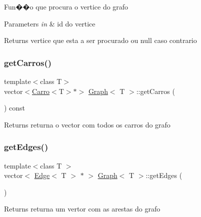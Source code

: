 Fun��o que procura o vertice do grafo 
\begin{DoxyParams}{Parameters}
{\em in} & id do vertice \\
\hline
\end{DoxyParams}
\begin{DoxyReturn}{Returns}
vertice que esta a ser procurado ou null caso contrario 
\end{DoxyReturn}
\mbox{\label{class_graph_ad9632be3533f44add76581600c89fd9f}} 
\subsubsection{\texorpdfstring{get\+Carros()}{getCarros()}}
{\footnotesize\ttfamily template$<$class T$>$ \\
vector$<$\mbox{\hyperlink{class_carro}{Carro}}$<$T$>$$\ast$$>$ \mbox{\hyperlink{class_graph}{Graph}}$<$ T $>$\+::get\+Carros (\begin{DoxyParamCaption}{ }\end{DoxyParamCaption}) const\hspace{0.3cm}{\ttfamily [inline]}}

\begin{DoxyReturn}{Returns}
returna o vector com todos os carros do grafo 
\end{DoxyReturn}
\mbox{\label{class_graph_acb8627c55454802f9e757d966f860938}} 
\subsubsection{\texorpdfstring{get\+Edges()}{getEdges()}}
{\footnotesize\ttfamily template$<$class T $>$ \\
vector$<$ \mbox{\hyperlink{class_edge}{Edge}}$<$ T $>$ $\ast$ $>$ \mbox{\hyperlink{class_graph}{Graph}}$<$ T $>$\+::get\+Edges (\begin{DoxyParamCaption}{ }\end{DoxyParamCaption})}

\begin{DoxyReturn}{Returns}
returna um vertor com as arestas do grafo 
\end{DoxyReturn}
\mbox{\label{class_graph_a7c3b4607aedc4818b74fce9002a5ab96}} 
